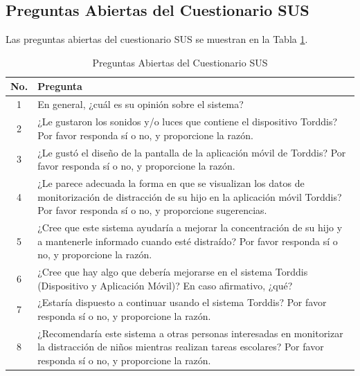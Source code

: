 \documentclass[a4paper,fleqn]{cas-sc}
\begin{document}
	\subsection[\appendixname~\thesection]{Preguntas Abiertas del Cuestionario SUS}
	\label{Appendix:OpenQuestions}
	Las preguntas abiertas del cuestionario SUS se muestran en la Tabla \ref{tab:OpenQuestion}.
	\begin{table}[bt!]
		\centering
		\caption{Preguntas Abiertas del Cuestionario SUS \label{tab:OpenQuestion}}
		\begin{tabularx}{\textwidth}{c X }
			\toprule
			\textbf{No.} & \textbf{Pregunta} \\
			\midrule
			1 & En general, ¿cuál es su opinión sobre el sistema? \\
			2 & ¿Le gustaron los sonidos y/o luces que contiene el dispositivo Torddis? Por favor responda sí o no, y proporcione la razón. \\
			3 & ¿Le gustó el diseño de la pantalla de la aplicación móvil de Torddis? Por favor responda sí o no, y proporcione la razón. \\
			4 & ¿Le parece adecuada la forma en que se visualizan los datos de monitorización de distracción de su hijo en la aplicación móvil Torddis? Por favor responda sí o no, y proporcione sugerencias. \\
			5 & ¿Cree que este sistema ayudaría a mejorar la concentración de su hijo y a mantenerle informado cuando esté distraído? Por favor responda sí o no, y proporcione la razón. \\
			6 & ¿Cree que hay algo que debería mejorarse en el sistema Torddis (Dispositivo y Aplicación Móvil)? En caso afirmativo, ¿qué? \\
			7 & ¿Estaría dispuesto a continuar usando el sistema Torddis? Por favor responda sí o no, y proporcione la razón. \\
			8 & ¿Recomendaría este sistema a otras personas interesadas en monitorizar la distracción de niños mientras realizan tareas escolares? Por favor responda sí o no, y proporcione la razón. \\ \bottomrule
		\end{tabularx}
	\end{table}
	
\end{document}
